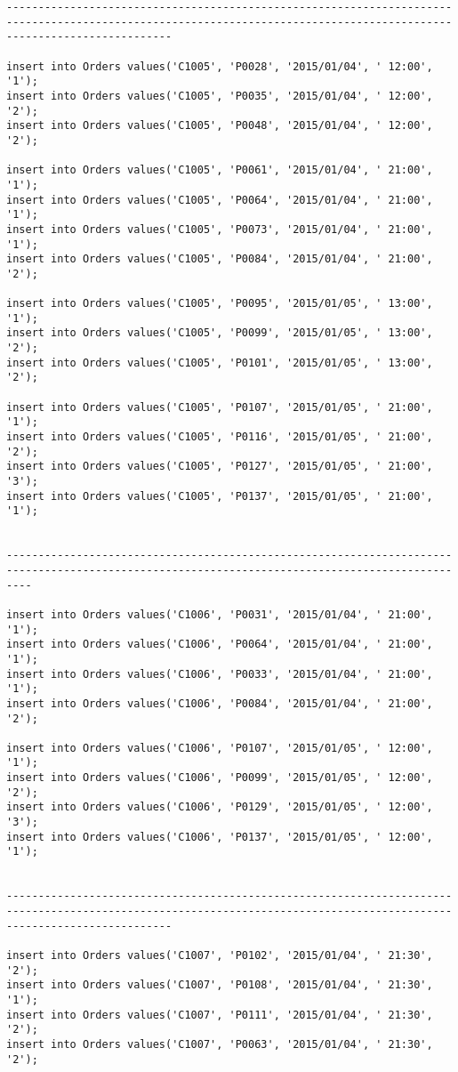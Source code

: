\documentclass[a4,12pt]{report}
\begin{document}
\begin{lstlisting}
----------------------------------------------------------------------------------------------------------------------------------------------------------------------

insert into Orders values('C1005', 'P0028', '2015/01/04', ' 12:00', '1');
insert into Orders values('C1005', 'P0035', '2015/01/04', ' 12:00', '2');
insert into Orders values('C1005', 'P0048', '2015/01/04', ' 12:00', '2');

insert into Orders values('C1005', 'P0061', '2015/01/04', ' 21:00', '1');
insert into Orders values('C1005', 'P0064', '2015/01/04', ' 21:00', '1');
insert into Orders values('C1005', 'P0073', '2015/01/04', ' 21:00', '1');
insert into Orders values('C1005', 'P0084', '2015/01/04', ' 21:00', '2');

insert into Orders values('C1005', 'P0095', '2015/01/05', ' 13:00', '1');
insert into Orders values('C1005', 'P0099', '2015/01/05', ' 13:00', '2');
insert into Orders values('C1005', 'P0101', '2015/01/05', ' 13:00', '2');

insert into Orders values('C1005', 'P0107', '2015/01/05', ' 21:00', '1');
insert into Orders values('C1005', 'P0116', '2015/01/05', ' 21:00', '2');
insert into Orders values('C1005', 'P0127', '2015/01/05', ' 21:00', '3');
insert into Orders values('C1005', 'P0137', '2015/01/05', ' 21:00', '1');


------------------------------------------------------------------------------------------------------------------------------------------------

insert into Orders values('C1006', 'P0031', '2015/01/04', ' 21:00', '1');
insert into Orders values('C1006', 'P0064', '2015/01/04', ' 21:00', '1');
insert into Orders values('C1006', 'P0033', '2015/01/04', ' 21:00', '1');
insert into Orders values('C1006', 'P0084', '2015/01/04', ' 21:00', '2');

insert into Orders values('C1006', 'P0107', '2015/01/05', ' 12:00', '1');
insert into Orders values('C1006', 'P0099', '2015/01/05', ' 12:00', '2');
insert into Orders values('C1006', 'P0129', '2015/01/05', ' 12:00', '3');
insert into Orders values('C1006', 'P0137', '2015/01/05', ' 12:00', '1');


----------------------------------------------------------------------------------------------------------------------------------------------------------------------

insert into Orders values('C1007', 'P0102', '2015/01/04', ' 21:30', '2');
insert into Orders values('C1007', 'P0108', '2015/01/04', ' 21:30', '1');
insert into Orders values('C1007', 'P0111', '2015/01/04', ' 21:30', '2');
insert into Orders values('C1007', 'P0063', '2015/01/04', ' 21:30', '2');


\end{lstlisting}
\end{document}
